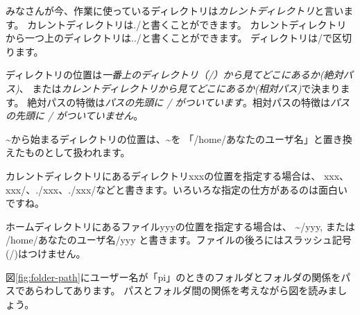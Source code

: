 みなさんが今、作業に使っているディレクトリは\emph{カレントディレクトリ}と言います。
カレントディレクトリは./と書くことができます。
カレントディレクトリから一つ上のディレクトリは../と書くことができます。
ディレクトリは/で区切ります。

ディレクトリの位置は\emph{一番上のディレクトリ（/）から見てどこにあるか(絶対パス)}、
または\emph{カレントディレクトリから見てどこにあるか(相対パス)}で決まります。
絶対パスの特徴は\emph{パスの先頭に / がついています}。相対パスの特徴は\emph{パスの先頭に / がついていません}。

\textasciitilde から始まるディレクトリの位置は、\textasciitilde を
「/home/あなたのユーザ名」と置き換えたものとして扱われます。

カレントディレクトリにあるディレクトリxxxの位置を指定する場合は、
xxx、xxx/、./xxx、./xxx/などと書きます。いろいろな指定の仕方があるのは面白いですね。

ホームディレクトリにあるファイルyyyの位置を指定する場合は、
\textasciitilde /yyy, または /home/あなたのユーザ名/yyy と書きます。ファイルの後ろにはスラッシュ記号(/)はつけません。

図\ref{fig:folder-path}にユーザー名が「pi」のときのフォルダとフォルダの関係をパスであらわしてあります。
パスとフォルダ間の関係を考えながら図を読みましょう。

